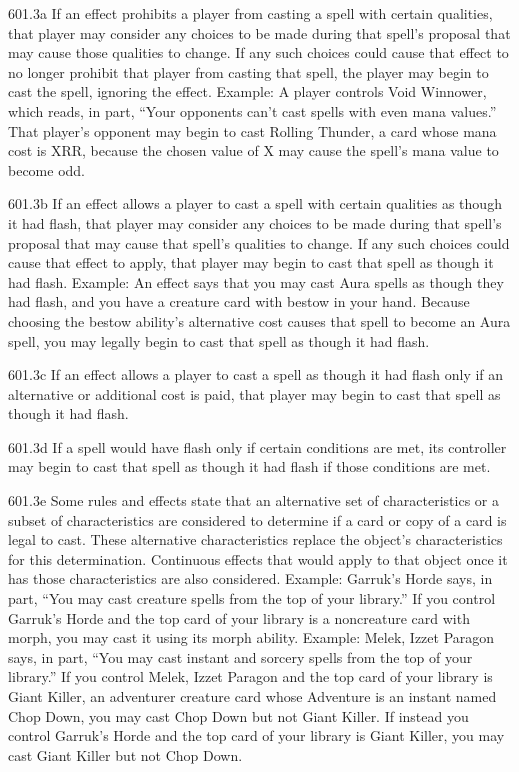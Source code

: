 601.3a If an effect prohibits a player from casting a spell with certain qualities, that player may consider any choices to be made during that spell’s proposal that may cause those qualities to change. If any such choices could cause that effect to no longer prohibit that player from casting that spell, the player may begin to cast the spell, ignoring the effect.
Example: A player controls Void Winnower, which reads, in part, “Your opponents can’t cast spells with even mana values.” That player’s opponent may begin to cast Rolling Thunder, a card whose mana cost is {X}{R}{R}, because the chosen value of X may cause the spell’s mana value to become odd.

601.3b If an effect allows a player to cast a spell with certain qualities as though it had flash, that player may consider any choices to be made during that spell’s proposal that may cause that spell’s qualities to change. If any such choices could cause that effect to apply, that player may begin to cast that spell as though it had flash.
Example: An effect says that you may cast Aura spells as though they had flash, and you have a creature card with bestow in your hand. Because choosing the bestow ability’s alternative cost causes that spell to become an Aura spell, you may legally begin to cast that spell as though it had flash.

601.3c If an effect allows a player to cast a spell as though it had flash only if an alternative or additional cost is paid, that player may begin to cast that spell as though it had flash.

601.3d If a spell would have flash only if certain conditions are met, its controller may begin to cast that spell as though it had flash if those conditions are met.

601.3e Some rules and effects state that an alternative set of characteristics or a subset of characteristics are considered to determine if a card or copy of a card is legal to cast. These alternative characteristics replace the object’s characteristics for this determination. Continuous effects that would apply to that object once it has those characteristics are also considered.
Example: Garruk’s Horde says, in part, “You may cast creature spells from the top of your library.” If you control Garruk’s Horde and the top card of your library is a noncreature card with morph, you may cast it using its morph ability.
Example: Melek, Izzet Paragon says, in part, “You may cast instant and sorcery spells from the top of your library.” If you control Melek, Izzet Paragon and the top card of your library is Giant Killer, an adventurer creature card whose Adventure is an instant named Chop Down, you may cast Chop Down but not Giant Killer. If instead you control Garruk’s Horde and the top card of your library is Giant Killer, you may cast Giant Killer but not Chop Down.

